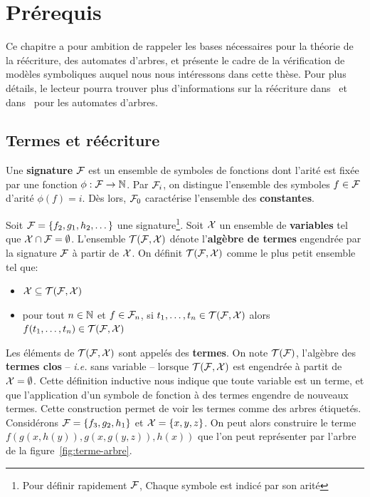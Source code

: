 \chapter{Prérequis}
\label{chap:preliminaires}

Ce chapitre a pour ambition de rappeler les bases nécessaires pour la théorie de la réécriture,
des automates d'arbres, et présente le cadre de la vérification de modèles symboliques auquel
nous nous intéressons dans cette thèse. Pour plus détails, le lecteur pourra trouver plus d'informations
sur la réécriture dans~\cite{BaaderN-book98} et dans~\cite{TATA} pour les automates d'arbres.


\section{Termes et réécriture}

\begin{definition}
  Une \textbf{signature} $\mathcal{F}$ est un ensemble de symboles de fonctions dont l'arité est fixée par
  une fonction $\phi : \mathcal{F} \rightarrow \mathbb{N}$. Par $\mathcal{F}_i$, on distingue l'ensemble des symboles $ f \in \mathcal{F}$
  d'arité $\phi(f) = i$. Dès lors, $\mathcal{F}_0$ caractérise l'ensemble des \textbf{constantes}.
\end{definition}


\begin{definition}
  Soit $\mathcal{F} = \{ f_2, g_1, h_2, \dots\}$ une signature\footnote{\footnotesize Pour définir rapidement $\mathcal{F}$, Chaque symbole est indicé par son arité}.
  Soit $\mathcal X$ un ensemble de \textbf{variables} tel que $\mathcal X \cap \mathcal{F} = \emptyset$.
  L'ensemble $\mathcal{T(F, X)}$ dénote l'\textbf{algèbre de termes} engendrée par la signature $\mathcal{F}$ à partir de $\mathcal X$. On définit $\mathcal{T(F, X)}$ comme le plus petit ensemble
  tel que:
  \begin{itemize}
  \item $\mathcal X \subseteq \mathcal{T(F, X)}$ 
  \item pour tout $n \in \mathbb{N}$ et $f \in \mathcal{F}_n$, si $t_1, \dots, t_n \in \mathcal{T(F, X)}$ alors $f(t_1, \dots, t_n) \in \mathcal{T(F, X)}$
  \end{itemize}
\end{definition}
Les éléments de $\mathcal{T(F, X)}$ sont appelés des \textbf{termes}. On note $\mathcal{T(F)}$, l'algèbre des \textbf{termes clos} -- \textit{i.e.} 
sans variable -- lorsque $\mathcal{T(F, X)}$ est engendrée à partit de $\mathcal X = \emptyset$.
Cette définition inductive nous indique que toute variable est un terme, 
et que l'application d'un symbole de fonction à des termes engendre de nouveaux termes. Cette construction permet de voir
les termes comme des arbres étiquetés.
Considérons $\mathcal{F} = \{ f_3, g_2, h_1 \}$ et $\mathcal X = \{x, y, z\}$. On peut alors construire le terme $f(g(x,h(y)), g(x, g(y, z)), h(x))$
que l'on peut représenter par l'arbre de la figure~\ref{fig:terme-arbre}.

